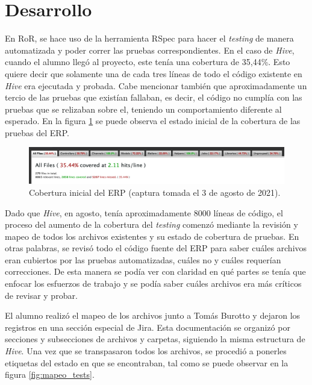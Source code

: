 \section{Desarrollo}

  En RoR, se hace uso de la herramienta RSpec para hacer el \textit{testing} de manera automatizada y poder correr las pruebas correspondientes. En el caso de \textit{Hive}, cuando el alumno llegó al proyecto, este tenía una cobertura de 35,44\%. Esto quiere decir que solamente una de cada tres líneas de todo el código existente en \textit{Hive} era ejecutada y probada. Cabe mencionar también que aproximadamente un tercio de las pruebas que existían fallaban, es decir, el código no cumplía con las pruebas que se relizaban sobre el, teniendo un comportamiento diferente al esperado.
   En la figura \ref{fig:testing_original} se puede observa el estado inicial de la cobertura de las pruebas del ERP.

  \begin{figure}[H]
    \centering
    \includegraphics[width=\linewidth]{figures/testing/testing_original.png}
    \caption{Cobertura inicial del ERP (captura tomada el 3 de agosto de 2021).}
    \label{fig:testing_original}
  \end{figure}

  Dado que \textit{Hive}, en agosto, tenía aproximadamente 8000 líneas de código, el proceso del aumento de la cobertura del \textit{testing} comenzó mediante la revisión y mapeo de todos los archivos existentes y su estado de cobertura de pruebas. En otras palabras, se revisó todo el código fuente del ERP para saber cuáles archivos eran cubiertos por las pruebas automatizadas, cuáles no y cuáles requerían correcciones. De esta manera se podía ver con claridad en qué partes se tenía que enfocar los esfuerzos de trabajo y se podía saber cuáles archivos era más críticos de revisar y probar.

  El alumno realizó el mapeo de los archivos junto a Tomás Burotto y dejaron los registros en una sección especial de Jira. Esta documentación se organizó por secciones y subsecciones de archivos y carpetas, siguiendo la misma estructura de \textit{Hive}. Una vez que se transpasaron todos los archivos, se procedió a ponerles etiquetas del estado en que se encontraban, tal como se puede observar en la figura \ref{fig:mapeo_tests}.
  

